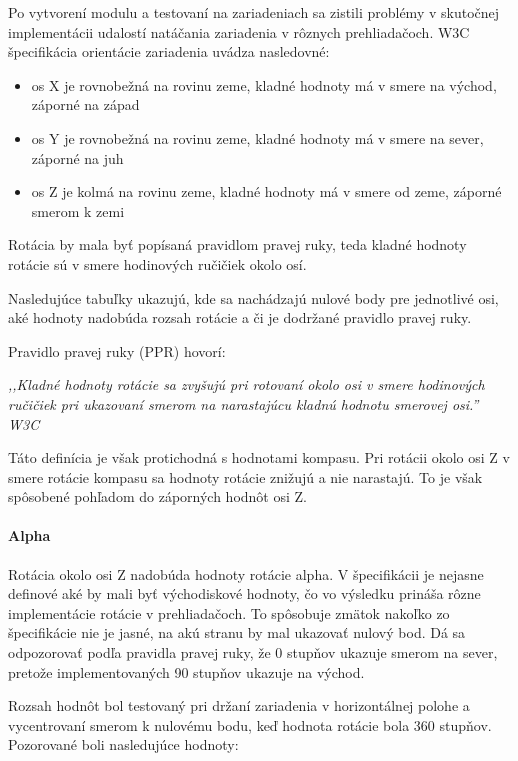 Po vytvorení modulu a testovaní na zariadeniach sa zistili problémy v skutočnej implementácii udalostí natáčania zariadenia v rôznych prehliadačoch. W3C špecifikácia orientácie zariadenia uvádza nasledovné:

\begin{itemize}
  \item os X je rovnobežná na rovinu zeme, kladné hodnoty má v smere na východ, záporné na západ
  \item os Y je rovnobežná na rovinu zeme, kladné hodnoty má v smere na sever, záporné na juh
  \item os Z je kolmá na rovinu zeme, kladné hodnoty má v smere od zeme, záporné smerom k zemi
\end{itemize}

Rotácia by mala byť popísaná pravidlom pravej ruky, teda kladné hodnoty rotácie sú v smere hodinových ručičiek okolo osí.

Nasledujúce tabuľky ukazujú, kde sa nachádzajú nulové body pre jednotlivé osi, aké hodnoty nadobúda rozsah rotácie a či je dodržané pravidlo pravej ruky.

Pravidlo pravej ruky (PPR) hovorí: 

\begin{fancybox}
\textit{,,Kladné hodnoty rotácie sa zvyšujú pri rotovaní okolo osi v smere hodinových ručičiek pri ukazovaní smerom na narastajúcu kladnú hodnotu smerovej osi.'' W3C \cite{deviceorientation}}
\end{fancybox}


Táto definícia je však protichodná s hodnotami kompasu. Pri rotácii okolo osi Z v smere rotácie kompasu sa hodnoty rotácie znižujú a nie narastajú. To je však spôsobené pohľadom do záporných hodnôt osi Z.


\paragraph{Alpha} %
\label{par:alpha}

Rotácia okolo osi Z nadobúda hodnoty rotácie alpha. V špecifikácii je nejasne definové aké by mali byť východiskové hodnoty, čo vo výsledku prináša rôzne implementácie rotácie v prehliadačoch. To spôsobuje zmätok nakoľko zo špecifikácie nie je jasné, na akú stranu by mal ukazovať nulový bod. Dá sa odpozorovať podľa pravidla pravej ruky, že 0 stupňov ukazuje smerom na sever, pretože implementovaných 90 stupňov ukazuje na východ.

Rozsah hodnôt bol testovaný pri držaní zariadenia v horizontálnej polohe a vycentrovaní smerom k nulovému bodu, keď hodnota rotácie bola 360 stupňov. Pozorované boli nasledujúce hodnoty:


